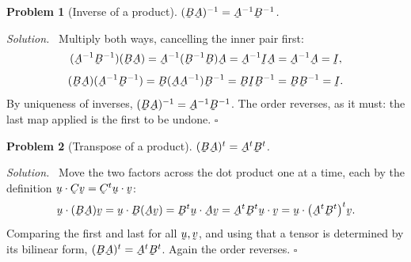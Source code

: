 \documentclass[17pt,a4paper]{extreport}
\DeclareRobustCommand{\vek}[1]{\underaccent{\tilde}{#1}}
\newcommand{\I}{\vek{I}}
\newcommand{\bu}{\vek{u}}
\newcommand{\bv}{\vek{v}}
\newcommand{\bA}{\vek{A}}
\newcommand{\bB}{\vek{B}}
\newcommand{\bC}{\vek{C}}
\newcommand{\ip}[2]{#1\cdot#2}
\theoremstyle{scplain}
\theoremstyle{scdefn}
\theoremstyle{scplain}
\newtheorem{problem}{Problem}
\newenvironment{solution}
 {\par\smallskip\noindent\textit{Solution.}\ }
 {\hfill$\square$\par\medskip}
\begin{document}
\begin{problem}[Inverse of a product]
$(\bB\bA)^{-1}=\bA^{-1}\bB^{-1}$.
\end{problem}
\begin{solution}
Multiply both ways, cancelling the inner pair first:
\[
   (\bA^{-1}\bB^{-1})(\bB\bA)=\bA^{-1}(\bB^{-1}\bB)\bA=\bA^{-1}\I\bA
   =\bA^{-1}\bA=\I,
\]
\[
   (\bB\bA)(\bA^{-1}\bB^{-1})=\bB(\bA\bA^{-1})\bB^{-1}=\bB\I\bB^{-1}
   =\bB\bB^{-1}=\I .
\]
By uniqueness of inverses, $(\bB\bA)^{-1}=\bA^{-1}\bB^{-1}$. The order
reverses, as it must: the last map applied is the first to be undone.
\end{solution}

\begin{problem}[Transpose of a product]
$(\bB\bA)^{t}=\bA^{t}\bB^{t}$.
\end{problem}
\begin{solution}
Move the two factors across the dot product one at a time, each by the
definition $\ip{\bu}{\bC\bv}=\ip{\bC^{t}\bu}{\bv}$:
\[
   \ip{\bu}{(\bB\bA)\bv}=\ip{\bu}{\bB(\bA\bv)}
   =\ip{\bB^{t}\bu}{\bA\bv}
   =\ip{\bA^{t}\bB^{t}\bu}{\bv}
   =\ip{\bu}{\big(\bA^{t}\bB^{t}\big)^{t}\bv}.
\]
Comparing the first and last for all $\bu,\bv$, and using that a tensor is
determined by its bilinear form, $(\bB\bA)^{t}=\bA^{t}\bB^{t}$. Again the
order reverses.
\end{solution}
\end{document}
